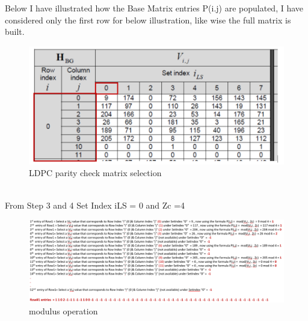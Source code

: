 \documentclass[journal,twocolumn]{IEEEtran}
\begin{document}
{{\begin{enumerate}
Below I have illustrated how the Base Matrix entries P(i.j) are populated, I have considered only the first row for below illustration, like wise the full matrix is built.\\
 \begin{figure}[h]
 \includegraphics[width=\columnwidth]{../figs/selbgs.png}    
     \caption{LDPC parity check matrix selection}
  \end{figure}\\
  From Step 3 and 4 Set Index iLS = 0 and Zc =4\\
   \begin{figure}[h]
 \includegraphics[width=\columnwidth]{../figs/mod.png}    
     \caption{modulus operation}
  \end{figure}\\
  

\end{enumerate}}}
\end{document}
